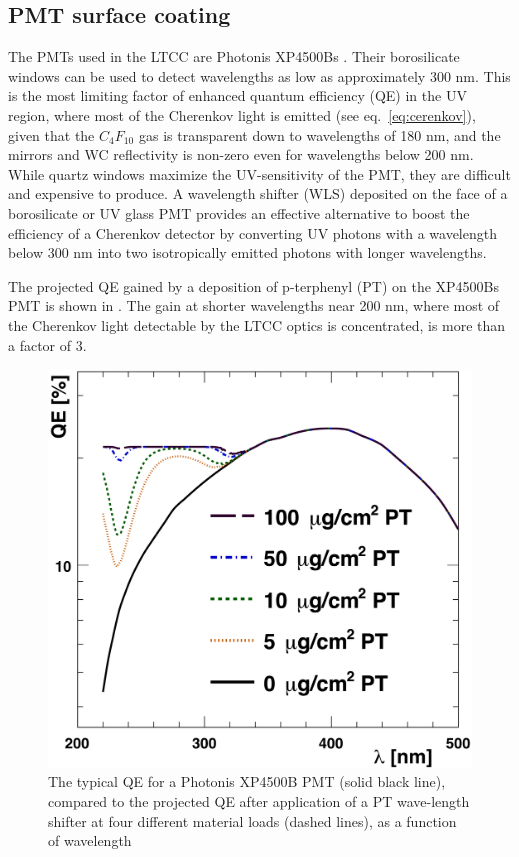 \subsection{PMT surface coating}

The PMTs used in the LTCC are Photonis XP4500Bs \cite{Photonis:2007ta}.
Their borosilicate windows can be used to detect wavelengths as low as approximately
300 nm. This is the most limiting factor of enhanced quantum efficiency (QE) in the UV region, where most of the Cherenkov
light is emitted (see eq.~\ref{eq:cerenkov}), given that the $C_4F_{10}$ gas is transparent down to
wavelengths of 180 nm, and the mirrors and WC reflectivity is non-zero
even for wavelengths below 200 nm.
While quartz windows maximize the UV-sensitivity of the PMT, they are difficult and expensive to produce.
A wavelength shifter (WLS) deposited on the face of a borosilicate or UV glass
PMT provides an effective alternative to boost the efficiency of a Cherenkov
detector by converting UV photons with a wavelength below 300 nm into two
isotropically emitted photons with longer wavelengths.

The projected QE gained by a deposition of p-terphenyl (PT) on the XP4500Bs
PMT \cite{Koczon:1457653} is shown in .
The gain at shorter wavelengths near 200 nm, where most of the Cherenkov light
detectable by the LTCC optics is concentrated, is more than a factor of 3.


\begin{figure}
	\centering
	\includegraphics[width=0.99\columnwidth, height=0.65\columnwidth]{img/pmtQuantumEfficiencyGain.png}
	\caption{The typical QE for a Photonis XP4500B PMT (solid black line), compared to the projected QE after application
			 of a PT wave-length shifter at four different material loads (dashed lines), as a function of wavelength}
	\label{fig:pmtQuantumEfficiencyGainAndExample}
\end{figure}

